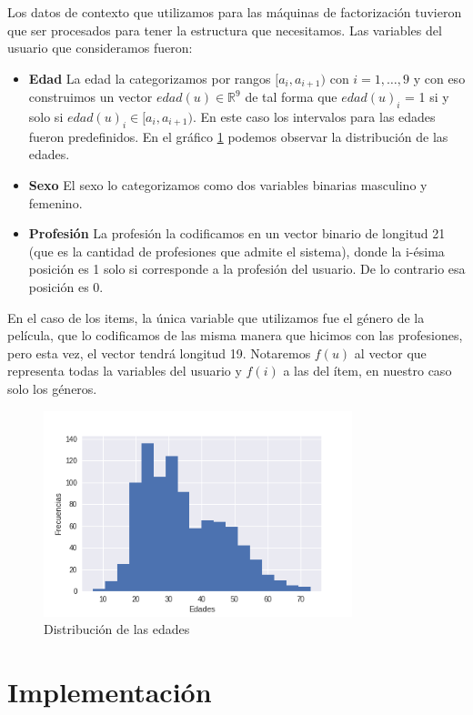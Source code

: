 \documentclass[hidelinks,12pt,a4paper]{book}
\theoremstyle{plain}
\theoremstyle{definition}
\begin{document}
Los datos de contexto que utilizamos para las máquinas de factorización tuvieron que ser procesados para tener la estructura que necesitamos. Las variables del usuario que consideramos fueron:

\begin{itemize}
\item \textbf{Edad} La edad la categorizamos por rangos $[a_i,a_{i+1})$ con $i= 1,\ldots,9$ y con eso construimos un vector $edad(u)\in \mathbb{R}^9$ de tal forma que $edad(u)_i$ = 1 si y solo si $edad(u)_i \in [a_i,a_{i+1})$. En este caso los intervalos para las edades fueron predefinidos. En el gráfico \ref{fig:edades} podemos observar la distribución de las edades.
\item \textbf{Sexo} El sexo lo categorizamos como dos variables binarias masculino y femenino.
\item \textbf{Profesión} La profesión la codificamos en un vector binario de longitud 21 (que es la cantidad de profesiones que admite el sistema), donde la i-ésima posición es 1 solo si corresponde a la profesión del usuario. De lo contrario esa posición es 0.
\end{itemize}

En el caso de los items, la única variable que utilizamos fue el género de la película, que lo codificamos de las misma manera que hicimos con las profesiones, pero esta vez, el vector tendrá longitud 19. Notaremos $f(u)$ al vector que representa todas la variables del usuario y $f(i)$ a las del ítem, en nuestro caso solo los géneros.

\begin{figure}[!ht]
\centering
\includegraphics[width=0.8\textwidth]{graficos/edades.png}
\caption{Distribución de las edades}\label{fig:edades}
\end{figure}

\section{Implementación}
\end{document}
